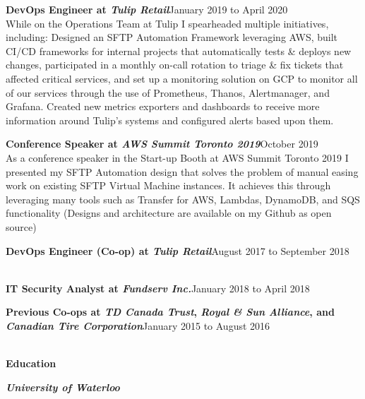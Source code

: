 \documentclass[9pt]{extarticle}
\begin{document}
{    \textbf{{\firamedium DevOps Engineer at \textit{Tulip Retail}}}{\color{darkgrey}\hfill{\small{January 2019 to April 2020\\[5pt]}}
        While on the Operations Team at Tulip I spearheaded multiple initiatives, including: Designed an SFTP Automation Framework leveraging AWS, built CI/CD frameworks for internal projects that automatically tests \& deploys new changes, participated in a monthly on-call rotation to triage \& fix tickets that affected critical services, and set up a monitoring solution on GCP to monitor all of our services through the use of Prometheus, Thanos, Alertmanager, and Grafana. Created new metrics exporters and dashboards to receive more information around Tulip's systems and configured alerts based upon them.\\[-10pt]
    }

    \textbf{{\firamedium Conference Speaker at \textit{AWS Summit Toronto 2019}}}{\color{darkgrey}\hfill{\small{October 2019\\[5pt]}}
        As a conference speaker in the Start-up Booth at AWS Summit Toronto 2019 I presented my SFTP Automation design that solves the problem of manual easing work on existing SFTP Virtual Machine instances. It achieves this through leveraging many tools such as Transfer for AWS, Lambdas, DynamoDB, and SQS functionality (Designs and architecture are available on my Github as open source)\\[-10pt]
    }

    \textbf{{\firamedium DevOps Engineer (Co-op) at \textit{Tulip Retail}}}{\color{darkgrey}\hfill{\small{August 2017 to September 2018\\[5pt]}}
        \\[-10pt]
    }

    \textbf{{\firamedium IT Security Analyst at \textit{Fundserv Inc.}}}{\color{darkgrey}\hfill{\small{January 2018 to April 2018\\[-20pt]}}
    }

    \textbf{{\firamedium Previous Co-ops at \textit{TD Canada Trust}, \textit{Royal \& Sun Alliance}, and \textit{Canadian Tire Corporation}}}{\color{darkgrey}\hfill{\small{January 2015 to August 2016 \\[-10pt]}}
    }
    {\color{lightgrey}{\centerline{\rule{17cm}{0.4pt}}}}
    \begin{LARGE}
        \color{em-light}\textbf{\\[-5pt]{\firamedium Education}\\[-15pt]}
    \end{LARGE}

    \textit{\textbf{{\firamedium University of Waterloo}}}{}
}
\end{document}
